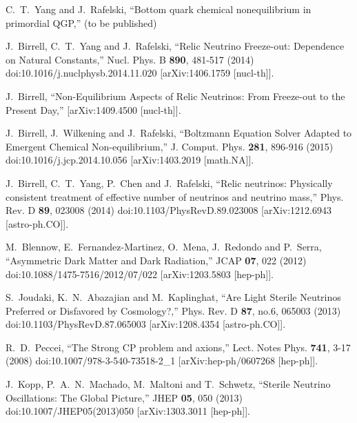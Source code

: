 \begin{thebibliography}{99}
C.~T.~Yang and J.~Rafelski,
``Bottom quark chemical nonequilibrium in primordial QGP,'' (to be published)


J.~Birrell, C.~T.~Yang and J.~Rafelski,
``Relic Neutrino Freeze-out: Dependence on Natural Constants,''
Nucl. Phys. B \textbf{890}, 481-517 (2014)
doi:10.1016/j.nuclphysb.2014.11.020
[arXiv:1406.1759 [nucl-th]].

J.~Birrell,
``Non-Equilibrium Aspects of Relic Neutrinos: From Freeze-out to the Present Day,''
[arXiv:1409.4500 [nucl-th]].

J.~Birrell, J.~Wilkening and J.~Rafelski,
``Boltzmann Equation Solver Adapted to Emergent Chemical Non-equilibrium,''
J. Comput. Phys. \textbf{281}, 896-916 (2015)
doi:10.1016/j.jcp.2014.10.056
[arXiv:1403.2019 [math.NA]].

J.~Birrell, C.~T.~Yang, P.~Chen and J.~Rafelski,
``Relic neutrinos: Physically consistent treatment of effective number of neutrinos and neutrino mass,''
Phys. Rev. D \textbf{89}, 023008 (2014)
doi:10.1103/PhysRevD.89.023008
[arXiv:1212.6943 [astro-ph.CO]].

M.~Blennow, E.~Fernandez-Martinez, O.~Mena, J.~Redondo and P.~Serra,
``Asymmetric Dark Matter and Dark Radiation,''
JCAP \textbf{07}, 022 (2012)
doi:10.1088/1475-7516/2012/07/022
[arXiv:1203.5803 [hep-ph]].

S.~Joudaki, K.~N.~Abazajian and M.~Kaplinghat,
``Are Light Sterile Neutrinos Preferred or Disfavored by Cosmology?,''
Phys. Rev. D \textbf{87}, no.6, 065003 (2013)
doi:10.1103/PhysRevD.87.065003
[arXiv:1208.4354 [astro-ph.CO]].

R.~D.~Peccei,
``The Strong CP problem and axions,''
Lect. Notes Phys. \textbf{741}, 3-17 (2008)
doi:10.1007/978-3-540-73518-2\_1
[arXiv:hep-ph/0607268 [hep-ph]].

J.~Kopp, P.~A.~N.~Machado, M.~Maltoni and T.~Schwetz,
``Sterile Neutrino Oscillations: The Global Picture,''
JHEP \textbf{05}, 050 (2013)
doi:10.1007/JHEP05(2013)050
[arXiv:1303.3011 [hep-ph]].


\end{thebibliography}
